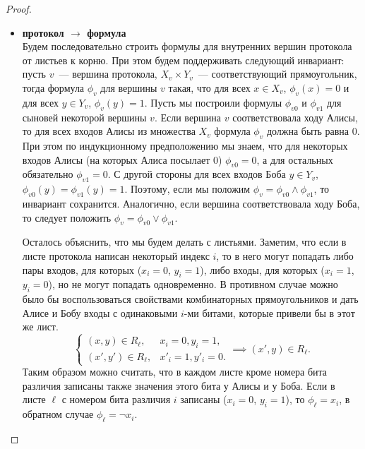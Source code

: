\documentclass[12pt]{article}
\theoremstyle{definition}
\theoremstyle{plain}
\theoremstyle{remark}
\begin{document}
\begin{proof}
\begin{itemize}
        \item \textbf{протокол $\to$ формула}\\
            Будем последовательно строить формулы для внутренних вершин протокола от листьев к корню.
            При этом будем поддерживать следующий инвариант: пусть $v$~--- вершина протокола, $X_v\times Y_v$~---
            соответствующий прямоугольник, тогда формула $\phi_v$ для вершины $v$ такая, что для всех $x\in X_v$,
            $\phi_v(x) = 0$ и для всех $y\in Y_v$, $\phi_v(y) = 1$. Пусть мы построили формулы $\phi_{v0}$ и
            $\phi_{v1}$ для сыновей некоторой вершины $v$. Если вершина $v$ соответствовала ходу Алисы,
            то для всех входов Алисы из множества $X_v$ формула $\phi_v$ должна быть равна 0. При 
            этом по индукционному предположению мы знаем, что для некоторых входов Алисы (на которых Алиса 
            посылает 0) $\phi_{v0}=0$, а для остальных обязательно $\phi_{v1} = 0$. С другой стороны для всех 
            входов Боба $y\in Y_v$, $\phi_{v0}(y) = \phi_{v1}(y) = 1$. Поэтому, если мы положим 
            $\phi_v = \phi_{v0} \land \phi_{v1}$, то инвариант сохранится. Аналогично, если вершина
            соответствовала ходу Боба, то следует положить $\phi_v = \phi_{v0} \lor \phi_{v1}$.

            Осталось объяснить, что мы будем делать с листьями. Заметим, что если в листе протокола
            написан некоторый индекс $i$, то в него могут попадать либо пары входов, для которых 
            ($x_i = 0$, $y_i=1$), либо входы, для которых ($x_i=1$, $y_i=0$), но не могут попадать
            одновременно. В противном случае можно было бы воспользоваться свойствами 
            комбинаторных прямоугольников и дать Алисе и Бобу входы с одинаковыми $i$-ми битами,
            которые привели бы в этот же лист.
            $$\begin{cases}
                (x,y)\in R_\ell, & x_i = 0, y_i = 1,\\
                (x',y')\in R_\ell, & x'_i = 1, y'_i = 0.
              \end{cases} \implies (x', y) \in R_\ell.
            $$
            Таким образом можно считать, что в каждом листе кроме номера бита различия записаны
            также значения этого бита у Алисы и у Боба. Если в листе $\ell$ с номером бита различия $i$
            записаны ($x_i = 0$, $y_i = 1$), то $\phi_\ell = x_i$, в обратном случае
            $\phi_\ell = \neg x_i$. 
    \end{itemize}
\end{proof}
\end{document}
